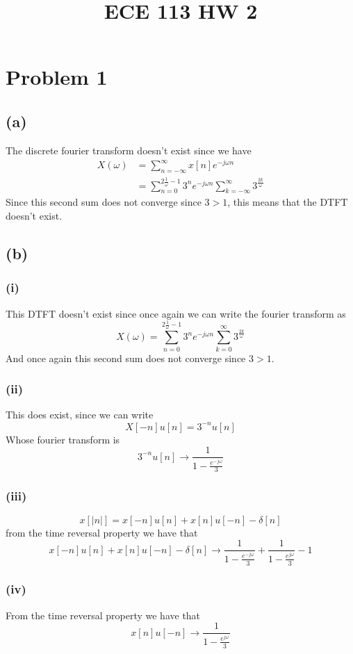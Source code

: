 
\title{ECE 113 HW 2}

\maketitle
\section*{Problem 1}
\subsection*{(a)}
The discrete fourier transform doesn't exist since we have
\begin{align*}
    X(\omega)&=\sum_{n=-\infty}^\infty x[n]e^{-j\omega n}\\
    &=\sum_{n=0}^{2\frac{1}{\omega}-1}3^{n}e^{-j\omega n}\sum_{k=-\infty}^{\infty}3^{\frac{2k}{\omega}}
\end{align*}
Since this second sum does not converge since $3>1$, this means that
the DTFT doesn't exist.
\subsection*{(b)}
\subsubsection*{(i)}
This DTFT doesn't exist since once again we can write the fourier transform
as 
$$X(\omega)=\sum_{n=0}^{2\frac{1}{\omega}-1}3^{n}e^{-j\omega n}\sum_{k=0}^{\infty}3^{\frac{2k}{\omega}}$$
And once again this second sum does not converge since $3>1$.
\subsubsection*{(ii)}
This does exist, since we can write 
$$X[-n]u[n]=3^{-n}u[n]$$
Whose fourier transform is 
$$3^{-n}u[n]\to \frac{1}{1-\frac{e^{-j\omega}}{3}}$$
\subsubsection*{(iii)}
$$x[|n|]=x[-n]u[n]+x[n]u[-n]-\delta[n]$$
from the time reversal property we have that
$$x[-n]u[n]+x[n]u[-n]-\delta[n]\to \frac{1}{1-\frac{e^{-j\omega}}{3}}+\frac{1}{1-\frac{e^{j\omega}}{3}}-1$$
\subsubsection*{(iv)}
From the time reversal property we have that
$$x[n]u[-n]\to\frac{1}{1-\frac{e^{j\omega}}{3}}$$
